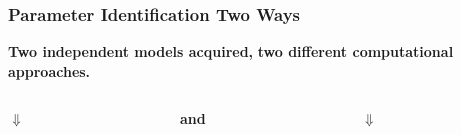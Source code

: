 \begin{frame}
    \frametitle{Parameter Identification Two Ways}
    \textbf{Two independent models acquired,}\newline
    \textbf{two different computational approaches.}
    \vspace{1cm}
    \begin{columns}[onlytextwidth]
        \begin{column}{0.4\textwidth}
            \begin{block}{}
            \end{block}
            
            \centering
            $\Downarrow$
            
            \begin{block}{}
            \end{block}
        \end{column}
        
        \begin{column}{0.065\textwidth}
        \textbf{and}
        \end{column}
        
        \begin{column}{0.4\textwidth}
            \begin{exampleblock}{}
            \end{exampleblock}
            
            \centering
            $\Downarrow$
            
            \begin{exampleblock}{}
            \end{exampleblock}
        \end{column}
    \end{columns}
\end{frame}		
		

